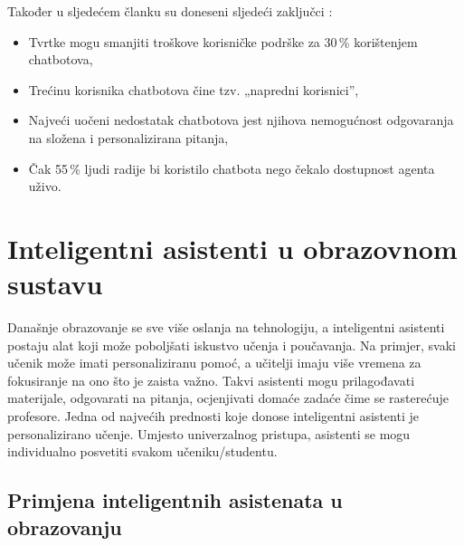 \documentclass[]{foi}
\begin{document}
Također u sljedećem članku su doneseni sljedeći zaključci \cite{connell2025chatbot}:
\begin{itemize}
    \item Tvrtke mogu smanjiti troškove korisničke podrške za 30\,\% korištenjem chatbotova,
    \item Trećinu korisnika chatbotova čine tzv. „napredni korisnici”,
    \item Najveći uočeni nedostatak chatbotova jest njihova nemogućnost odgovaranja na složena i personalizirana pitanja,
    \item Čak 55\,\% ljudi radije bi koristilo chatbota nego čekalo dostupnost agenta uživo.
\end{itemize}

\newpage
\section{Inteligentni asistenti u obrazovnom sustavu}

Današnje obrazovanje se sve više oslanja na tehnologiju, a inteligentni asistenti postaju alat koji može poboljšati iskustvo učenja i poučavanja. Na primjer, svaki učenik može imati
personaliziranu pomoć, a učitelji imaju više vremena za fokusiranje na ono što je zaista važno. Takvi asistenti mogu prilagođavati materijale, odgovarati na pitanja, ocjenjivati domaće zadaće
čime se rasterećuje profesore. Jedna od najvećih prednosti koje donose inteligentni asistenti je personalizirano učenje. Umjesto univerzalnog pristupa, asistenti se mogu individualno 
posvetiti svakom učeniku/studentu. 

\subsection{Primjena inteligentnih asistenata u obrazovanju}
\end{document}
